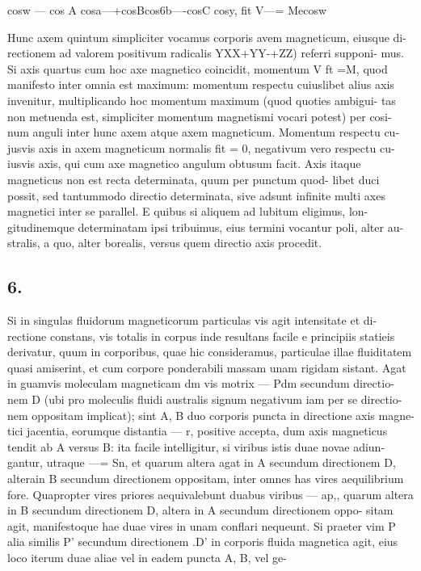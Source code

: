 \documentclass[12pt,a4paper]{article}
\begin{document}
cosw --- cos A cosa---+cosBcos6b----cosC cosy,                  fit    V---= Mecosw

Hunc axem quintum simpliciter vocamus                 corporis avem magneticum,     eiusque di-
rectionem ad valorem positivum radicalis              YXX+YY-+ZZ)              referri supponi-
mus.  Si axis quartus cum hoc axe magnetico coincidit, momentum V ft =M,
quod manifesto inter omnia est maximum: momentum respectu cuiuslibet alius
axis invenitur,      multiplicando   hoc    momentum        maximum      (quod quoties ambigui-
tas non metuenda est, simpliciter momentum magnetismi vocari potest) per cosi-
num anguli inter hunc axem atque axem magneticum. Momentum respectu cu-
jusvis axis in axem magneticum normalis fit = 0, negativum vero respectu cu-
iusvis axis, qui cum axe magnetico angulum obtusum facit.
Axis itaque magneticus non est recta determinata, quum per punctum quod-
libet duci possit, sed tantummodo directio determinata, sive adsunt infinite multi
axes magnetici inter se parallel.           E quibus si aliquem ad lubitum eligimus, lon-
gitudinemque determinatam ipsi tribuimus, eius termini vocantur poli, alter au-
stralis, a quo, alter borealis, versus quem directio axis procedit.


\subsection*{6.}

Si in singulas fluidorum magneticorum particulas vis agit intensitate et di-
rectione constans, vis totalis in corpus inde resultans facile e principiis statieis
derivatur, quum in corporibus, quae hic consideramus, particulae illae fluiditatem
quasi amiserint, et cum corpore ponderabili massam unam rigidam sistant.                  Agat
in guamvis moleculam magneticam dm                vis motrix    --- Pdm       secundum directio-
nem D (ubi pro moleculis fluidi australis signum negativum iam per se directio-
nem oppositam implicat); sint A, B duo corporis puncta in directione axis magne-
tici jacentia, eorumque distantia --- r, positive accepta, dum axis magneticus
tendit ab A versus B: ita facile intelligitur, si viribus istis duae novae adiun-
gantur,    utraque    ---= Sn, et quarum altera agat in A secundum                directionem   D,
alterain B secundum directionem oppositam, inter omnes has vires aequilibrium
fore. Quapropter vires priores aequivalebunt duabus viribus --- ap,, quarum
altera in B secundum directionem D, altera in A secundum directionem oppo-
sitam agit, manifestoque hae duae vires in unam conflari nequeunt.
Si praeter vim P alia similis P' secundum directionem .D' in corporis fluida
magnetica agit, eius loco iterum duae aliae vel in eadem puncta A, B, vel ge-
\end{document}
